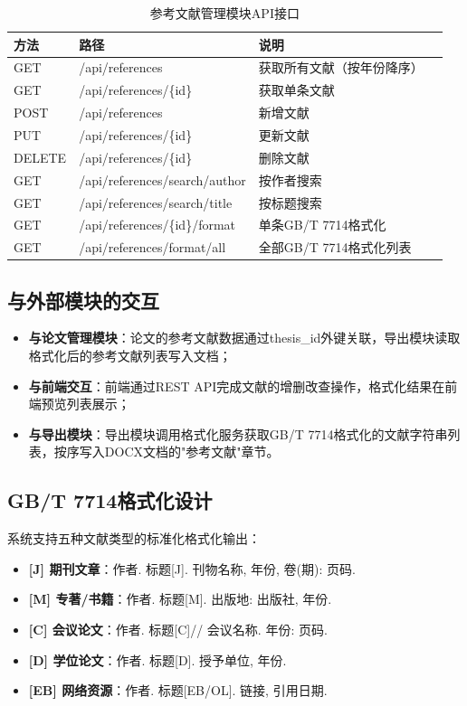 \documentclass{../../softeng}
\begin{document}
\begin{table}[htbp]
\centering
\caption{参考文献管理模块API接口}
\label{tab:ref_api}
\begin{tabular}{lllp{5cm}}
\toprule
\textbf{方法} & \textbf{路径} & \textbf{说明} \\
\midrule
GET    & /api/references       & 获取所有文献（按年份降序） \\
GET    & /api/references/\{id\} & 获取单条文献 \\
POST   & /api/references       & 新增文献 \\
PUT    & /api/references/\{id\} & 更新文献 \\
DELETE & /api/references/\{id\} & 删除文献 \\
GET    & /api/references/search/author & 按作者搜索 \\
GET    & /api/references/search/title  & 按标题搜索 \\
GET    & /api/references/\{id\}/format & 单条GB/T 7714格式化 \\
GET    & /api/references/format/all   & 全部GB/T 7714格式化列表 \\
\bottomrule
\end{tabular}
\end{table}

\subsection{与外部模块的交互}

\begin{itemize}
    \item \textbf{与论文管理模块}：论文的参考文献数据通过thesis\_id外键关联，导出模块读取格式化后的参考文献列表写入文档；
    \item \textbf{与前端交互}：前端通过REST API完成文献的增删改查操作，格式化结果在前端预览列表展示；
    \item \textbf{与导出模块}：导出模块调用格式化服务获取GB/T 7714格式化的文献字符串列表，按序写入DOCX文档的"参考文献"章节。
\end{itemize}

\subsection{GB/T 7714格式化设计}

系统支持五种文献类型的标准化格式化输出：

\begin{itemize}
    \item \textbf{[J] 期刊文章}：作者. 标题[J]. 刊物名称, 年份, 卷(期): 页码.
    \item \textbf{[M] 专著/书籍}：作者. 标题[M]. 出版地: 出版社, 年份.
    \item \textbf{[C] 会议论文}：作者. 标题[C]// 会议名称. 年份: 页码.
    \item \textbf{[D] 学位论文}：作者. 标题[D]. 授予单位, 年份.
    \item \textbf{[EB] 网络资源}：作者. 标题[EB/OL]. 链接, 引用日期.
\end{itemize}
\end{document}
